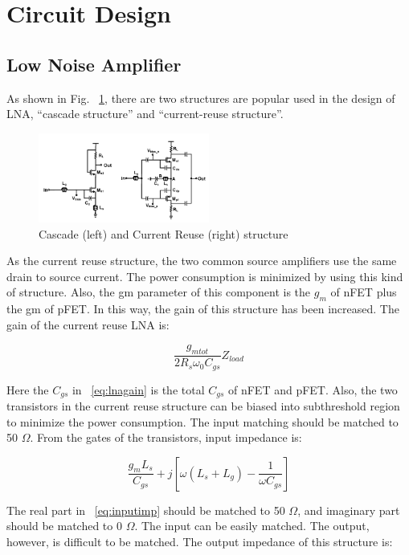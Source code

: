 \section{Circuit Design}
\subsection{Low Noise Amplifier}
As shown in Fig. ~\ref{fig:lna}, there are two structures are popular used in the design of LNA, “cascade structure” and “current-reuse structure”. 

\begin{figure}[h]
   \centering
    \includegraphics[width=0.5\textwidth]{figures/LNA.png}
    \caption{Cascade (left) and Current Reuse (right) structure ~\cite{lna}}
    \label{fig:lna}
\end{figure}

As the current reuse structure, the two common source amplifiers use the same drain to source current. The power consumption is minimized by using this kind of structure. Also, the gm parameter of this component is the $g_m$ of nFET plus the gm of pFET. In this way, the gain of this structure has been increased. The gain of the current reuse LNA is:

\begin{equation} 
  	\frac{g_{mtot}}{2R_s \omega_0 C_{gs}}Z_{load}
	\label{eq:lnagain}
\end{equation}

Here the $C_{gs}$ in ~\ref{eq:lnagain} is the total $C_{gs}$ of nFET and pFET. Also, the two transistors in the current reuse structure can be biased into subthreshold region to minimize the power consumption. The input matching should be matched to 50 $\Omega$. From the gates of the transistors, input impedance is:

\begin{equation} 
  	\frac{g_mL_s}{C_{gs}} + j[\omega (L_s+L_g) - \frac{1}{\omega C_{gs}}]
	\label{eq:inputimp}
\end{equation}

The real part in ~\ref{eq:inputimp} should be matched to 50 $\Omega$, and imaginary part should be matched to 0 $\Omega$. The input can be easily matched. The output, however, is difficult to be matched. The output impedance of this structure is:

